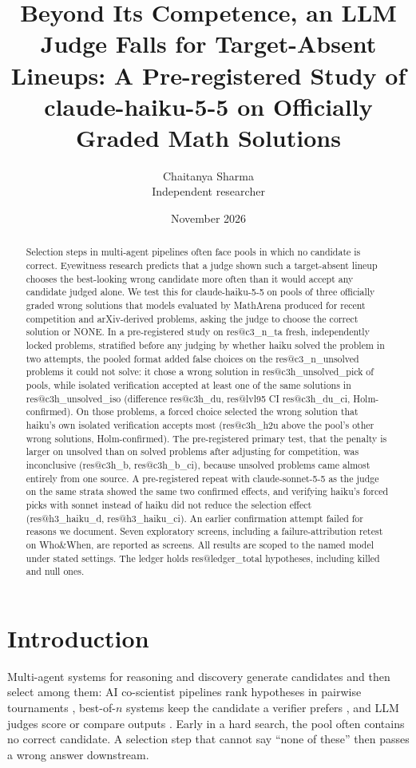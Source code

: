 \documentclass[10pt,twocolumn]{article}
\title{Beyond Its Competence, an LLM Judge Falls for Target-Absent Lineups: A Pre-registered Study of claude-haiku-5-5 on Officially Graded Math Solutions}
\author{Chaitanya Sharma\\Independent researcher}
\date{November 2026}
\makeatletter
\newcommand{\res}[1]{\csname res@#1\endcsname}
\makeatother
\begin{document}
\maketitle

\begin{abstract}
Selection steps in multi-agent pipelines often face pools in which no candidate is correct. Eyewitness research predicts that a judge shown such a target-absent lineup chooses the best-looking wrong candidate more often than it would accept any candidate judged alone. We test this for claude-haiku-5-5 on pools of three officially graded wrong solutions that models evaluated by MathArena produced for recent competition and arXiv-derived problems, asking the judge to choose the correct solution or NONE. In a pre-registered study on \res{c3_n_ta} fresh, independently locked problems, stratified before any judging by whether haiku solved the problem in two attempts, the pooled format added false choices on the \res{c3_n_unsolved} problems it could not solve: it chose a wrong solution in \res{c3h_unsolved_pick} of pools, while isolated verification accepted at least one of the same solutions in \res{c3h_unsolved_iso} (difference \res{c3h_du}, \res{lvl95} CI \res{c3h_du_ci}, Holm-confirmed). On those problems, a forced choice selected the wrong solution that haiku's own isolated verification accepts most (\res{c3h_h2u} above the pool's other wrong solutions, Holm-confirmed). The pre-registered primary test, that the penalty is larger on unsolved than on solved problems after adjusting for competition, was inconclusive (\res{c3h_b}, \res{c3h_b_ci}), because unsolved problems came almost entirely from one source. A pre-registered repeat with claude-sonnet-5-5 as the judge on the same strata showed the same two confirmed effects, and verifying haiku's forced picks with sonnet instead of haiku did not reduce the selection effect (\res{h3_haiku_d}, \res{h3_haiku_ci}). An earlier confirmation attempt failed for reasons we document. Seven exploratory screens, including a failure-attribution retest on Who\&When, are reported as screens. All results are scoped to the named model under stated settings. The ledger holds \res{ledger_total} hypotheses, including killed and null ones.
\end{abstract}

\section{Introduction}
Multi-agent systems for reasoning and discovery generate candidates and then select among them: AI co-scientist pipelines rank hypotheses in pairwise tournaments \citep{gottweis2025towards}, best-of-$n$ systems keep the candidate a verifier prefers \citep{cobbe2021training,brown2024large,stroebl2026limits}, and LLM judges score or compare outputs \citep{zheng2023judging}. Early in a hard search, the pool often contains no correct candidate. A selection step that cannot say ``none of these'' then passes a wrong answer downstream.
\end{document}
